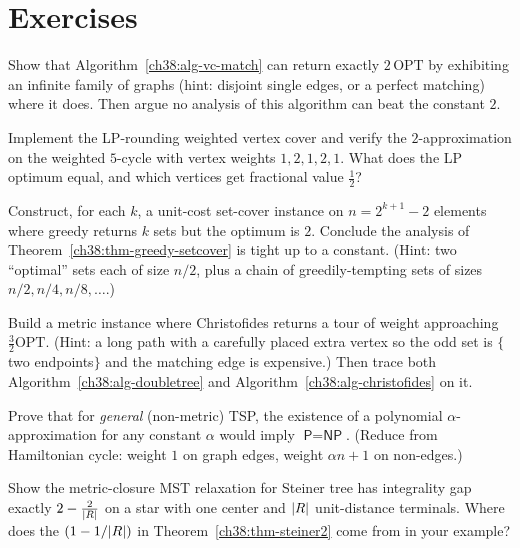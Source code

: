 \section{Exercises}

\begin{exercise}\label{ch38:ex-vc-tight}
Show that Algorithm~\ref{ch38:alg-vc-match} can return exactly $2\,\mathrm{OPT}$ by exhibiting an
infinite family of graphs (hint: disjoint single edges, or a perfect matching) where it does. Then
argue no analysis of this algorithm can beat the constant $2$.
\end{exercise}

\begin{exercise}\label{ch38:ex-vc-weighted}
Implement the LP-rounding weighted vertex cover and verify the $2$-approximation on the weighted
$5$-cycle with vertex weights $1,2,1,2,1$. What does the LP optimum equal, and which vertices get
fractional value $\tfrac12$?
\end{exercise}

\begin{exercise}\label{ch38:ex-setcover-tight}
Construct, for each $k$, a unit-cost set-cover instance on $n=2^{k+1}-2$ elements where greedy returns
$k$ sets but the optimum is $2$. Conclude the analysis of
Theorem~\ref{ch38:thm-greedy-setcover} is tight up to a constant. (Hint: two ``optimal'' sets each of
size $n/2$, plus a chain of greedily-tempting sets of sizes $n/2, n/4, n/8,\dots$.)
\end{exercise}

\begin{exercise}\label{ch38:ex-christofides-tight}
Build a metric instance where Christofides returns a tour of weight approaching
$\tfrac32\mathrm{OPT}$. (Hint: a long path with a carefully placed extra vertex so the odd set is
$\{$two endpoints$\}$ and the matching edge is expensive.) Then trace both
Algorithm~\ref{ch38:alg-doubletree} and Algorithm~\ref{ch38:alg-christofides} on it.
\end{exercise}

\begin{exercise}\label{ch38:ex-tsp-nonmetric}
Prove that for \emph{general} (non-metric) TSP, the existence of a polynomial $\alpha$-approximation
for any constant $\alpha$ would imply $\textsf{P}=\textsf{NP}$. (Reduce from Hamiltonian cycle: weight
$1$ on graph edges, weight $\alpha n + 1$ on non-edges.)
\end{exercise}

\begin{exercise}\label{ch38:ex-steiner-gap}
Show the metric-closure MST relaxation for Steiner tree has integrality gap exactly
$2-\tfrac2{\lvert R\rvert}$ on a star with one center and $\lvert R\rvert$ unit-distance terminals. Where does the
$(1-1/\lvert R\rvert)$ in Theorem~\ref{ch38:thm-steiner2} come from in your example?
\end{exercise}

